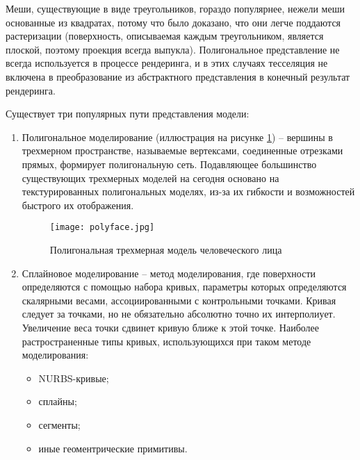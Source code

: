 Меши, существующие в виде треугольников, гораздо популярнее, нежели меши основанные из квадратах, 
потому что было доказано, что они легче поддаются растеризации (поверхность, описываемая каждым треугольником, является плоской, поэтому проекция всегда выпукла).
Полигональное представление не всегда используется в процессе рендеринга, и в этих случаях тесселяция не включена в преобразование из абстрактного представления в конечный результат рендеринга.

Существует три популярных пути представления модели:

\begin{enumerate}[label=\arabic*.]
\item Полигональное моделирование (иллюстрация на рисунке \ref{figure:domain:polyface}) -- вершины в трехмерном пространстве, называемые вертексами, соединенные отрезками прямых, формирует полигональную сеть.
Подавляющее большинство существующих трехмерных моделей на сегодня основано на текстурированных полигональных моделях, из-за их гибкости
и возможностей быстрого их отображения.

\begin{figure}[ht]
\centering
  \texttt{[image: polyface.jpg]}
  \caption{Полигональная трехмерная модель человеческого лица}
  \label{figure:domain:polyface}
\end{figure}

\item{Сплайновое моделирование -- метод моделирования, где поверхности определяются с помощью набора кривых,
параметры которых определяются скалярными весами, ассоциированными с контрольными точками. Кривая следует за точками, но не обязательно абсолютно
точно их интерполиует. Увеличение веса точки сдвинет кривую ближе к этой точке.
Наиболее растространенные типы кривых, использующихся при таком методе моделирования:
\begin{itemize}
\item NURBS-кривые;
\item сплайны;
\item сегменты;
\item иные геоментрические примитивы.
\end{itemize}
}


\end{enumerate}
